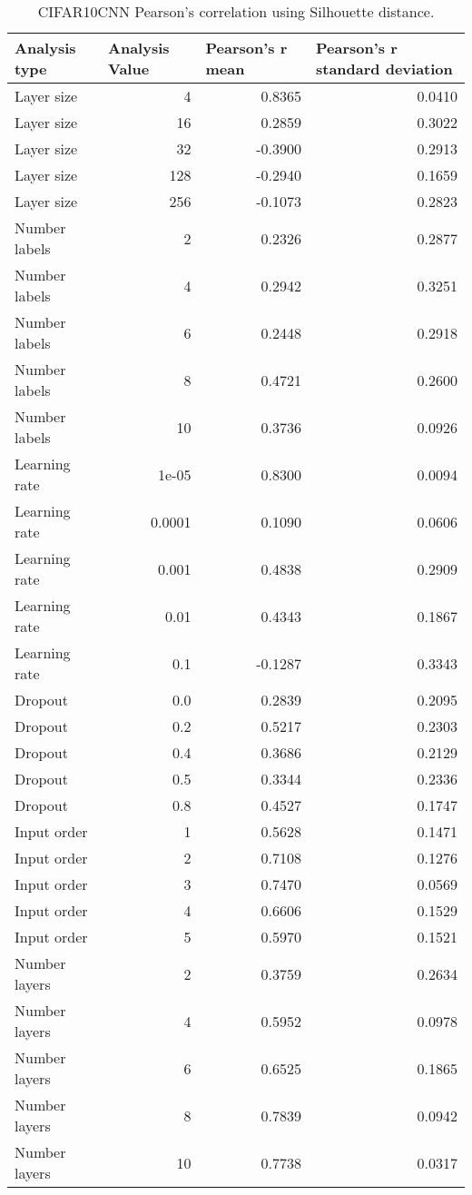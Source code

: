 \documentclass{article}
\begin{document}
\begin{table}[H]
\centering
\begin{tabular}{@{}lrrr@{}}
\toprule
Analysis type & \multicolumn{1}{l}{Analysis Value} & \multicolumn{1}{l}{Pearson's r mean} & \multicolumn{1}{l}{Pearson's r standard deviation} \\ \midrule
Layer size & 4 & 0.8365 & 0.0410 \\ 
Layer size & 16 & 0.2859 & 0.3022 \\ 
Layer size & 32 & -0.3900 & 0.2913 \\ 
Layer size & 128 & -0.2940 & 0.1659 \\ 
Layer size & 256 & -0.1073 & 0.2823 \\ 
Number labels & 2 & 0.2326 & 0.2877 \\ 
Number labels & 4 & 0.2942 & 0.3251 \\ 
Number labels & 6 & 0.2448 & 0.2918 \\ 
Number labels & 8 & 0.4721 & 0.2600 \\ 
Number labels & 10 & 0.3736 & 0.0926 \\ 
Learning rate & 1e-05 & 0.8300 & 0.0094 \\ 
Learning rate & 0.0001 & 0.1090 & 0.0606 \\ 
Learning rate & 0.001 & 0.4838 & 0.2909 \\ 
Learning rate & 0.01 & 0.4343 & 0.1867 \\ 
Learning rate & 0.1 & -0.1287 & 0.3343 \\ 
Dropout & 0.0 & 0.2839 & 0.2095 \\ 
Dropout & 0.2 & 0.5217 & 0.2303 \\ 
Dropout & 0.4 & 0.3686 & 0.2129 \\ 
Dropout & 0.5 & 0.3344 & 0.2336 \\ 
Dropout & 0.8 & 0.4527 & 0.1747 \\ 
Input order & 1 & 0.5628 & 0.1471 \\ 
Input order & 2 & 0.7108 & 0.1276 \\ 
Input order & 3 & 0.7470 & 0.0569 \\ 
Input order & 4 & 0.6606 & 0.1529 \\ 
Input order & 5 & 0.5970 & 0.1521 \\ 
Number layers & 2 & 0.3759 & 0.2634 \\ 
Number layers & 4 & 0.5952 & 0.0978 \\ 
Number layers & 6 & 0.6525 & 0.1865 \\ 
Number layers & 8 & 0.7839 & 0.0942 \\ 
Number layers & 10 & 0.7738 & 0.0317 \\ 
\bottomrule
\end{tabular}
\caption{CIFAR10CNN Pearson's correlation using Silhouette distance.}
\end{table}
\end{document}
